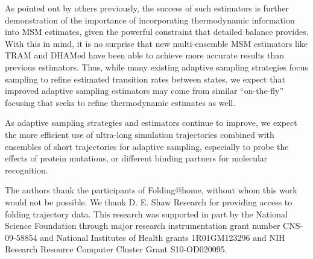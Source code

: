 \documentclass[%
 aip,
rsi,%
 amsmath,amssymb,
 reprint,%
]{revtex4-1}
\begin{document}
As pointed out by others previously,\cite{trendelkamp2016efficient} the success of such estimators is further demonstration of the importance of incorporating thermodynamic information into MSM estimates, given the powerful constraint that detailed balance provides. With this in mind, it is no surprise that new multi-ensemble MSM estimators like TRAM\cite{Wu:2016fk} and DHAMed\cite{Stelzl:2017gra} have been able to achieve more accurate results than previous estimators. Thus, while many existing adaptive sampling strategies focus sampling to refine estimated transition rates between states, we expect that improved adaptive sampling estimators may come from similar ``on-the-fly'' focusing that seeks to refine thermodynamic estimates as well.  

As adaptive sampling strategies and estimators continue to improve, we expect the more efficient use of ultra-long simulation trajectories combined with ensembles of short trajectories for adaptive sampling, especially to probe the effects of protein mutations, or different binding partners for molecular recognition.


\begin{acknowledgments}
The authors thank the participants of Folding@home, without whom this work would not be possible.  We thank D. E. Shaw Research for providing access to folding trajectory data. This research was supported in part by the National Science Foundation through major research instrumentation grant number CNS-09-58854 and National Institutes of Health grants 1R01GM123296 and NIH Research Resource Computer Cluster Grant S10-OD020095.
\end{acknowledgments}

%




\newpage


\end{document}

